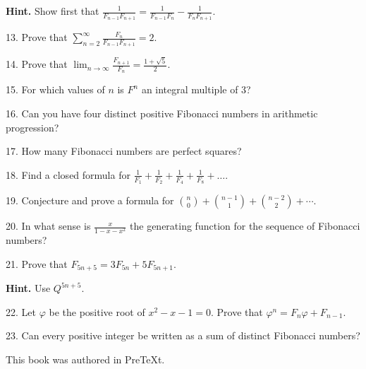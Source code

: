 \documentclass[10pt,]{book}
\theoremstyle{plain}
\theoremstyle{definition}
\begin{document}
\begin{exerciselist}
\par\smallskip
\par\smallskip
\noindent\textbf{Hint.}\hypertarget{hint-1}{}\quad
Show first that \(\frac{1}{F_{n - 1}F_{n + 1}} = \frac{1}{F_{n - 1}F_{n}} -
\frac{1}{F_{n}F_{n + 1}}\).%
\item[13.]\hypertarget{exercise-13}{}Prove that \(\sum_{n = 2}^{\infty}\frac{F_{n}}{F_{n - 1}F_{n + 1}} = 2.\)%
\par\smallskip
\item[14.]\hypertarget{exercise-14}{}Prove that \(\lim_{n\to\infty}\frac{F_{n + 1}}{F_{n}} = \frac{1 + \sqrt{5}}{2}.\)%
\par\smallskip
\item[15.]\hypertarget{exercise-15}{}For which values of \(n\) is \(F^{n}\) an integral multiple of 3?%
\par\smallskip
\item[16.]\hypertarget{exercise-16}{}Can you have four distinct positive Fibonacci numbers in arithmetic progression?%
\par\smallskip
\item[17.]\hypertarget{exercise-17}{}How many Fibonacci numbers are perfect squares?%
\par\smallskip
\item[18.]\hypertarget{exercise-18}{}Find a closed formula for \(\frac{1}{F_{1}} + \frac{1}{F_{2}} + \frac{1}{F_{4}} + \frac{1}{F_{8}} + \ldots.\)%
\par\smallskip
\item[19.]\hypertarget{exercise-19}{}Conjecture and prove a formula for \(\binom{n}{0} + \binom{n-1}{1} + \binom{n-2}{2} + \cdots\).%
\par\smallskip
\item[20.]\hypertarget{exercise-20}{}In what sense is \(\frac{x}{1 - x - x^{2}}\) the generating function for the sequence of Fibonacci numbers?%
\par\smallskip
\item[21.]\hypertarget{exercise-21}{}Prove that \(F_{5n + 5} = 3F_{5n} + 5F_{5n + 1}\).%
\par\smallskip
\par\smallskip
\noindent\textbf{Hint.}\hypertarget{hint-2}{}\quad
Use \(Q^{5n + 5}\).%
\item[22.]\hypertarget{exercise-22}{}Let \(\varphi\) be the positive root of \(x^{2} - x - 1 = 0\). Prove that \(\varphi^{n} = F_{n}\varphi + F_{n - 1}\).%
\par\smallskip
\item[23.]\hypertarget{exercise-23}{}Can every positive integer be written as a sum of distinct Fibonacci numbers?%
\par\smallskip
\end{exerciselist}
%
\backmatter
%
%
%
\cleardoublepage
\pagestyle{empty}
\centerline{This book was authored in PreTeXt.%
}
\end{document}
